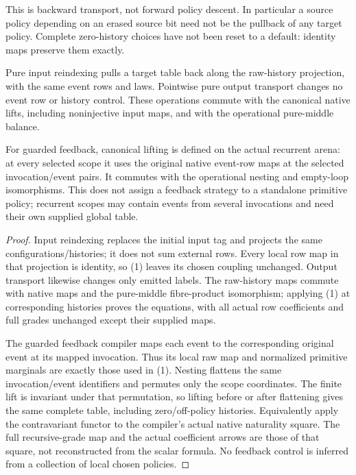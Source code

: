 \documentclass[11pt]{article}
\begin{document}
This is backward transport, not forward policy descent. In particular a source policy depending on an erased source bit need not be the pullback of any target policy. Complete zero-history choices have not been reset to a default: identity maps preserve them exactly.

\begin{proposition}
Pure input reindexing pulls a target table back along the raw-history projection, with the same event rows and laws. Pointwise pure output transport changes no event row or history control. These operations commute with the canonical native lifts, including noninjective input maps, and with the operational pure-middle balance.

For guarded feedback, canonical lifting is defined on the actual recurrent arena: at every selected scope it uses the original native event-row maps at the selected invocation/event pairs. It commutes with the operational nesting and empty-loop isomorphisms. This does not assign a feedback strategy to a standalone primitive policy; recurrent scopes may contain events from several invocations and need their own supplied global table.
\end{proposition}
\begin{proof}
Input reindexing replaces the initial input tag and projects the same configurations/histories; it does not sum external rows. Every local row map in that projection is identity, so (1) leaves its chosen coupling unchanged. Output transport likewise changes only emitted labels. The raw-history maps commute with native maps and the pure-middle fibre-product isomorphism; applying (1) at corresponding histories proves the equations, with all actual row coefficients and full grades unchanged except their supplied maps.

The guarded feedback compiler maps each event to the corresponding original event at its mapped invocation. Thus its local raw map and normalized primitive marginals are exactly those used in (1). Nesting flattens the same invocation/event identifiers and permutes only the scope coordinates. The finite lift is invariant under that permutation, so lifting before or after flattening gives the same complete table, including zero/off-policy histories. Equivalently apply the contravariant functor to the compiler's actual native naturality square. The full recursive-grade map and the actual coefficient arrows are those of that square, not reconstructed from the scalar formula. No feedback control is inferred from a collection of local chosen policies.\end{proof}
\end{document}
